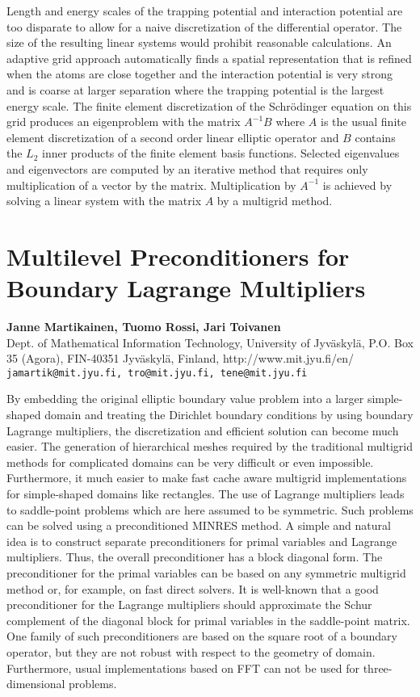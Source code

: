 \documentclass[11pt]{article}
\newcommand{\nextab}[4]{
	\section{#2}
	{\bf #1} \\ \nopagebreak
	{#3} \\ \nopagebreak
	{\tt #4} \nopagebreak
	}
\begin{document}
Length and energy scales of the trapping potential and interaction
potential are too disparate to allow for a naive discretization of
the differential operator. The size of the resulting linear systems would
prohibit reasonable calculations. An adaptive grid approach automatically
finds a spatial representation that is refined when the atoms are close
together and the interaction potential is very strong and is coarse
at larger separation where the trapping potential is the largest
energy scale.  The finite element discretization of the Schr\"odinger
equation on this grid produces an eigenproblem with the matrix
$A^{-1}B$ where $A$ is the usual finite
element discretization of a second order linear elliptic operator and
$B$ contains the $L_2$ inner products of the
finite element basis functions.  Selected eigenvalues and eigenvectors
are computed by an iterative method that requires only multiplication
of a vector by the matrix.  Multiplication by $A^{-1}$
is achieved by solving a linear system with the matrix $A$ by a
multigrid method.





\nextab
{Janne Martikainen, Tuomo Rossi, Jari Toivanen}
{Multilevel Preconditioners for Boundary Lagrange Multipliers}
{Dept. of Mathematical Information Technology,
University of Jyv\"askyl\"a,
P.O. Box 35 (Agora), FIN-40351 Jyv\"askyl\"a, Finland,
http://www.mit.jyu.fi/en/}
{jamartik@mit.jyu.fi, tro@mit.jyu.fi, tene@mit.jyu.fi}


By embedding the original elliptic boundary value problem into a larger
simple-shaped domain and treating the Dirichlet boundary conditions by
using boundary Lagrange multipliers, the discretization and efficient
solution can become much easier. The generation of hierarchical meshes
required by the traditional multigrid methods for complicated domains
can be very difficult or even impossible. Furthermore, it much easier
to make fast cache aware multigrid implementations for simple-shaped
domains like rectangles. The use of Lagrange multipliers leads to
saddle-point problems which are here assumed to be symmetric.
Such problems can be solved using a preconditioned MINRES method.
A simple and natural idea is to construct separate preconditioners
for primal variables and Lagrange multipliers. Thus, the overall
preconditioner has a block diagonal form. The preconditioner for
the primal variables can be based on any symmetric multigrid method or,
for example, on fast direct solvers. It is well-known that a good
preconditioner for the Lagrange multipliers should approximate the
Schur complement of the diagonal block for primal variables in
the saddle-point matrix. One family of such preconditioners are based
on the square root of a boundary operator, but they are not robust with
respect to the geometry of domain. Furthermore, usual implementations
based on FFT can not be used for three-dimensional problems.
\end{document}
